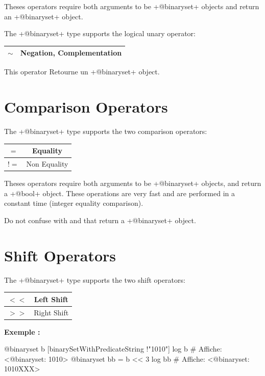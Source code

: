 Theses operators require both arguments to be \ggsq+@binaryset+ objects and return an \ggsq+@binaryset+ object.\newline


The \ggsq+@binaryset+ type supports the logical unary operator:\newline

\begin{tabular}{|c|c|}
\hline
$\sim$ & Negation, Complementation \\
\hline
\end{tabular}

This operator Retourne un \ggsq+@binaryset+ object.







\section{Comparison Operators}

The \ggsq+@binaryset+ type supports the two comparison operators:\newline

\begin{tabular}{|c|c|}
\hline
$=$ & Equality \\
\hline
$!=$ & Non Equality \\
\hline
\end{tabular}

Theses operators require both arguments to be \ggsq+@binaryset+ objects, and return a \ggsq+@bool+ object. These operations are very fast and are performed in a constant time (integer equality comparison).

Do not confuse with  and  that return a \ggsq+@binaryset+ object.







\section{Shift Operators}

The \ggsq+@binaryset+ type supports the two shift operators:\newline

\begin{tabular}{|c|c|}
\hline
$<<$ & Left Shift \\
\hline
$>>$ & Right Shift \\
\hline
\end{tabular}

\textbf{Exemple :}
\begin{galgas4}
@binaryset b [binarySetWithPredicateString !"1010"]
log b # Affiche: <@binaryset: 1010>
@binaryset bb = b << 3
log bb # Affiche: <@binaryset: 1010XXX>
\end{galgas4}

